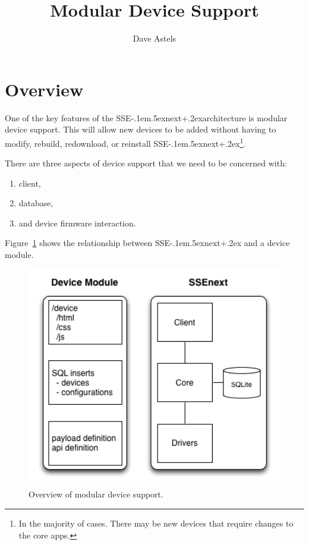 \documentclass[12pt]{article}
\title{\SSEnext Modular Device Support}
\author{Dave Astels}
\def\SSEnext{SSE\kern-.1em\lower.5ex\hbox{\footnotesize next}\kern+.2ex}
\def\SSEnext{SSE\kern-.1em\lower.5ex\hbox{\footnotesize next}\kern+.2ex}
\begin{document}
\maketitle

\section{Overview}

One of the key features of the \SSEnext architecture is modular device
support. This will allow new devices to be added without having to
modify, rebuild, redownload, or reinstall \SSEnext\footnote{In the
  majority of cases. There may be new devices that require changes to
  the core apps.}.

There are three aspects of device support that we need to be concerned
with:
\begin{enumerate}
\item client,
\item database,
\item and device firmware interaction.
\end{enumerate}

Figure~\ref{fig:blockdiagram} shows the relationship between \SSEnext
and a device module.

\begin{figure}[htbp] %
   \centering
   \includegraphics[width=5in]{block_diagram.png} 
\caption{Overview of modular device support.}
\label{fig:blockdiagram}
\end{figure}
\end{document}
